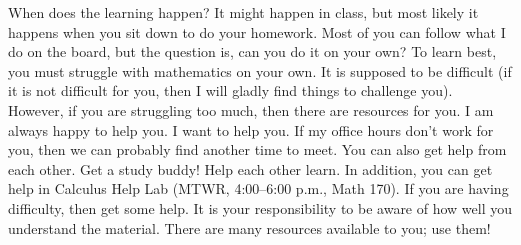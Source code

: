 \documentclass[12pt]{amsart}
\begin{document}
\medskip

When does the learning happen?  It might happen in class, but most likely it happens when you sit down to do your homework.  Most of you can follow what I do on the board, but the question is, can you do it on your own?  To learn best, you must struggle with mathematics on your own.  It is supposed to be difficult (if it is not difficult for you, then I will gladly find things to challenge you).  However, if you are struggling too much, then there are resources for you.  I am always happy to help you.  I want to help you.  If my office hours don't work for you, then we can probably find another time to meet.  You can also get help from each other.  Get a study buddy!  Help each other learn.  In addition, you can get help in Calculus Help Lab (MTWR, 4:00--6:00 p.m., Math 170). If you are having difficulty, then get some help.  It is your responsibility to be aware of how well you understand the material.  There are many resources available to you; use them!
\end{document}
